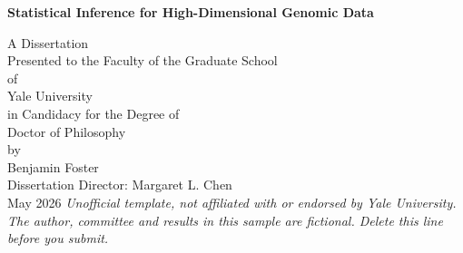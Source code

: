 \begin{titlepage}
\centering
\vspace*{0.6in}
{\large\bfseries Statistical Inference for High-Dimensional Genomic Data\par}
\vspace{0.6in}
A Dissertation\\
Presented to the Faculty of the Graduate School\\
of\\
Yale University\\
in Candidacy for the Degree of\\
Doctor of Philosophy\\[0.5in]
by\\
Benjamin Foster\\[0.5in]
Dissertation Director: Margaret L. Chen\\[0.5in]
May 2026
\vfill
{\footnotesize\itshape Unofficial template, not affiliated with or endorsed by Yale University. The author, committee and results in this sample are fictional. Delete this line before you submit.}
\end{titlepage}
